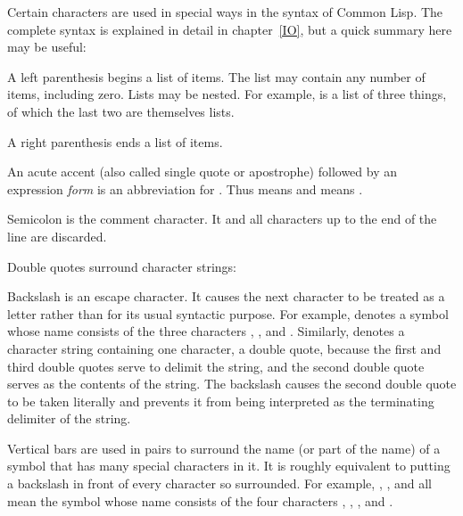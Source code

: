 Certain characters are used in special ways in the syntax of Common Lisp.
The complete syntax is explained in detail in chapter~\ref{IO},
but a quick summary here may be useful:
\begin{indentdesc}{1.2pc}
\item[\cd{(}]
A left parenthesis begins a list of items.  The list may
contain any number of items, including zero.  Lists may be nested.
For example,  is a list of three things,
of which the last two are themselves lists.

\item[\cd{)}] A right parenthesis ends a list of items.

\item[\cd{\Xquote}] An acute accent (also called single
quote or apostrophe) followed by an expression {\it form}
is an abbreviation for .  Thus  means
 and  means .

\item[\cd{;}] Semicolon is the comment character.  It and all
characters up to the end of the line are discarded.

\item[\cd{"}] Double quotes surround character strings: \\

\item[\cd{{\Xbackslash}}] Backslash is an escape character. 
It causes the next character to be treated as a letter rather than for its usual
syntactic purpose.  For example,  denotes a symbol whose
name consists of the three characters , \cd{(}, and . Similarly,
 denotes a character string containing one character, a
double quote, because the first and third double quotes serve to delimit the
string, and the second double quote serves as the contents of the string.  The
backslash causes the second double quote to be taken literally and prevents it
from being interpreted as the terminating delimiter of the string.

\item[\cd{|}] Vertical bars are used in pairs
to surround the name (or part of the name) of a symbol that has
many special characters in it.  It is roughly equivalent to putting a
backslash in front of every character so surrounded.  For example,
, , and  all mean the symbol whose name
consists of the four characters , \cd{(}, , and \cd{)}.


\end{indentdesc}
